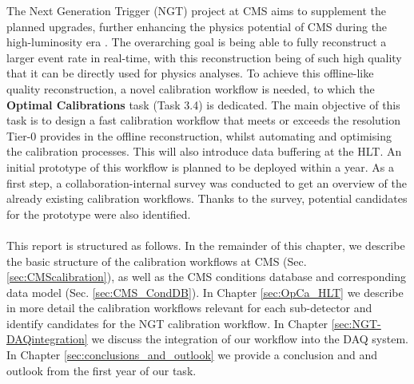 The Next Generation Trigger (NGT) project at CMS aims to supplement the planned upgrades, further enhancing the physics potential of CMS during the high-luminosity era \cite{NGT_proposal}. The overarching goal is being able to fully reconstruct a larger event rate in real-time, with this reconstruction being of such high quality that it can be directly used for physics analyses.
\newline \newline
To achieve this offline-like quality reconstruction, a novel calibration workflow is needed, to which the \textbf{Optimal Calibrations} task (Task 3.4) is dedicated. The main objective of this task is to design a fast calibration workflow that meets or exceeds the resolution Tier-0 provides in the offline reconstruction, whilst automating and optimising the calibration processes. This will also introduce data buffering at the HLT. An initial prototype of this workflow is planned to be deployed within a year. As a first step, a collaboration-internal survey was conducted to get an overview of the already existing calibration workflows. Thanks to the survey, potential candidates for the prototype were also identified. \\ \\ 
This report is structured as follows.
In the remainder of this chapter, we describe the basic structure of the calibration workflows at CMS (Sec. \ref{sec:CMScalibration}), as well as the CMS conditions database and corresponding data model (Sec. \ref{sec:CMS_CondDB}).
In Chapter \ref{sec:OpCa_HLT} we describe in more detail the calibration workflows relevant for each sub-detector and identify candidates for the NGT calibration workflow. In Chapter \ref{sec:NGT-DAQintegration} we discuss the integration of our workflow into the DAQ system. In Chapter \ref{sec:conclusions_and_outlook} we provide a conclusion and and outlook from the first year of our task.


